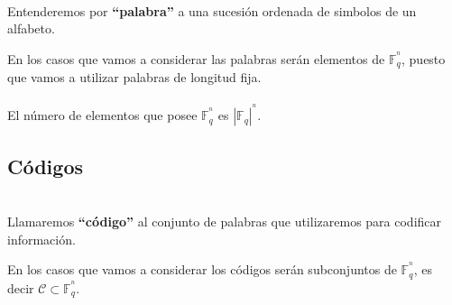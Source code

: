 \begin{definicion}[Palabra]
\ \\
Entenderemos por \textbf{``palabra''} a una sucesi\'on ordenada de simbolos de
un alfabeto.
\end{definicion}
En los casos que vamos a considerar las palabras ser\'an elementos de
$\mathbb{F}^{^n}_q$, puesto que vamos a utilizar palabras de longitud fija.\\ \\
%
El n\'umero de elementos que posee $\mathbb{F}^{^n}_q$ es $|\mathbb{F}_q|^{^n}$.


\subsection{C\'odigos}

\begin{definicion}[C\'odigos]
\ \\
Llamaremos \textbf{``c\'odigo''} al conjunto de palabras que utilizaremos para
codificar informaci\'on.
\end{definicion}
En los casos que vamos a considerar los c\'odigos ser\'an subconjuntos de
$\mathbb{F}^{^n}_q$, es decir $\mathcal{C}\subset \mathbb{F}^{^n}_q$.
